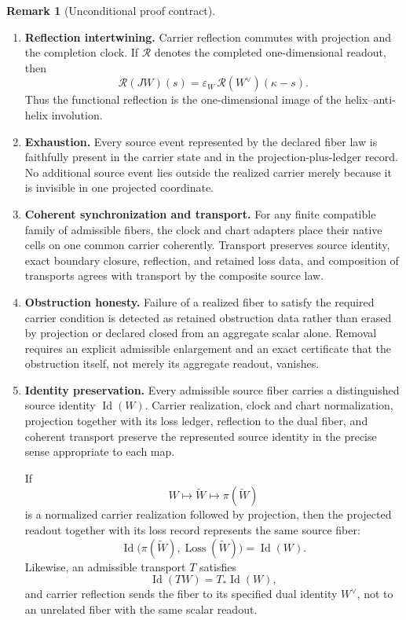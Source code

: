 \documentclass[11pt]{article}
\theoremstyle{definition}
\newtheorem{remark}[theorem]{Remark}
\begin{document}
\begin{remark}[Unconditional proof contract]
\begin{enumerate}
\item[\textup{(U6)}] \textbf{Reflection intertwining.}
Carrier reflection commutes with projection and the completion clock.  If
\(\mathcal R\) denotes the completed one-dimensional readout, then
\[
\mathcal R(JW)(s)
=
\varepsilon_W\,\mathcal R(W^\vee)(\kappa-s).
\]
Thus the functional reflection is the one-dimensional image of the
helix--anti-helix involution.

\item[\textup{(U7)}] \textbf{Exhaustion.}
Every source event represented by the declared fiber law is faithfully present
in the carrier state and in the projection-plus-ledger record.  No additional
source event lies outside the realized carrier merely because it is invisible
in one projected coordinate.

\item[\textup{(U8)}] \textbf{Coherent synchronization and transport.}
For any finite compatible family of admissible fibers, the clock and chart
adapters place their native cells on one common carrier coherently.  Transport
preserves source identity, exact boundary closure, reflection, and retained
loss data, and composition of transports agrees with transport by the
composite source law.

\item[\textup{(U9)}] \textbf{Obstruction honesty.}
Failure of a realized fiber to satisfy the required carrier condition is
detected as retained obstruction data rather than erased by projection or
declared closed from an aggregate scalar alone.  Removal requires an explicit
admissible enlargement and an exact certificate that the obstruction itself,
not merely its aggregate readout, vanishes.
\item[\textup{(U4)}] \textbf{Identity preservation.}
Every admissible source fiber carries a distinguished source identity
\(\operatorname{Id}(W)\).  Carrier realization, clock and chart normalization,
projection together with its loss ledger, reflection to the dual fiber, and
coherent transport preserve the represented source identity in the precise
sense appropriate to each map.

If
\[
W
\longmapsto
\widetilde W
\longmapsto
\pi(\widetilde W)
\]
is a normalized carrier realization followed by projection, then the projected
readout together with its loss record represents the same source fiber:
\[
\operatorname{Id}
\bigl(\pi(\widetilde W),\operatorname{Loss}(\widetilde W)\bigr)
=
\operatorname{Id}(W).
\]
Likewise, an admissible transport \(T\) satisfies
\[
\operatorname{Id}(T W)
=
T_\ast\operatorname{Id}(W),
\]
and carrier reflection sends the fiber to its specified dual identity
\(W^\vee\), not to an unrelated fiber with the same scalar readout.


\end{enumerate}
\end{remark}
\end{document}
